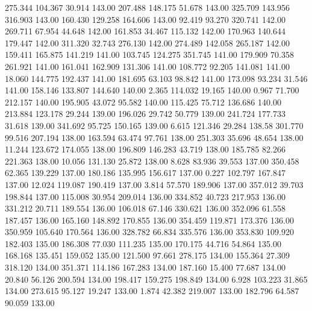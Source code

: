 275.344  104.367   30.914       143.00
 207.488  148.175   51.678       143.00
 325.709  143.956  316.903       143.00
 160.430  129.258  164.606       143.00
  92.419   93.270  320.741       142.00
 269.711   67.954   44.648       142.00
 161.853   34.467  115.132       142.00
 170.963  140.644  179.447       142.00
 311.320   32.743  276.130       142.00
 274.489  142.058  265.187       142.00
 159.411  165.875  141.219       141.00
 103.745  124.275  351.745       141.00
 179.909   70.358  261.921       141.00
 161.041  162.909  131.306       141.00
 108.772   92.205  141.081       141.00
  18.060  144.775  192.437       141.00
 181.695   63.103   98.842       141.00
 173.098   93.234   31.546       141.00
 158.146  133.807  144.640       140.00
   2.365  114.032   19.165       140.00
   0.967   71.700  212.157       140.00
 195.905   43.072   95.582       140.00
 115.425   75.712  136.686       140.00
 213.884  123.178   29.244       139.00
 196.026   29.742   50.779       139.00
 241.724  177.733   31.618       139.00
 341.692   95.725  150.165       139.00
   6.615  121.346   29.284       138.58
 301.770   99.516  207.194       138.00
 163.594   63.474   97.761       138.00
 251.303   35.696   48.654       138.00
  11.244  123.672  174.055       138.00
 196.809  146.283   43.719       138.00
 185.785   82.266  221.363       138.00
  10.056  131.130   25.872       138.00
   8.628   83.936   39.553       137.00
 350.458   62.365  139.229       137.00
 180.186  135.995  156.617       137.00
   0.227  102.797  167.847       137.00
  12.024  119.087  190.419       137.00
   3.814   57.570  189.906       137.00
 357.012   39.703  198.844       137.00
 115.008   30.954  209.014       136.00
 334.852   40.723  217.953       136.00
 331.212   20.711  189.554       136.00
 106.018   67.146  330.621       136.00
 352.096   61.558  187.457       136.00
 165.160  148.892  170.855       136.00
 354.459  119.871  173.376       136.00
 350.959  105.640  170.564       136.00
 328.782   66.834  335.576       136.00
 353.830  109.920  182.403       135.00
 186.308   77.030  111.235       135.00
 170.175   44.716   54.864       135.00
 168.168  135.451  159.052       135.00
 121.500   97.661  278.175       134.00
 155.364   27.309  318.120       134.00
 351.371  114.186  167.283       134.00
 187.160   15.400   77.687       134.00
  20.840   56.126  200.594       134.00
 198.417  159.275  198.849       134.00
   6.928  103.223   31.865       134.00
 273.615   95.127   19.247       133.00
   1.874   42.382  219.007       133.00
 182.796   64.587   90.059       133.00
